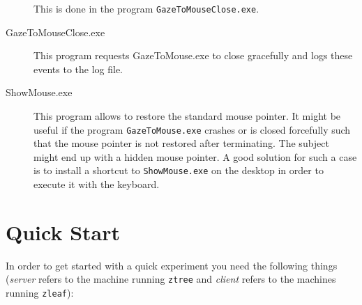 \documentclass[a4paper,oneside]{book}
\begin{document}
\begin{description}
        This is done in the program \texttt{GazeToMouseClose.exe}.
    \item[GazeToMouseClose.exe] This program requests GazeToMouse.exe to close gracefully and logs these events to the log file.
    \item[ShowMouse.exe] This program allows to restore the standard mouse pointer.
        It might be useful if the program \texttt{GazeToMouse.exe} crashes or is closed forcefully such that the mouse pointer is not restored after terminating.
        The subject might end up with a hidden mouse pointer.
        A good solution for such a case is to install a shortcut to \texttt{ShowMouse.exe} on the desktop in order to execute it with the keyboard.
\end{description}

\chapter{Quick Start}
\label{sec.quick}
In order to get started with a quick experiment you need the following things (\emph{server} refers to the machine running \texttt{ztree} and \emph{client} refers to the machines running \texttt{zleaf}):
\end{document}
